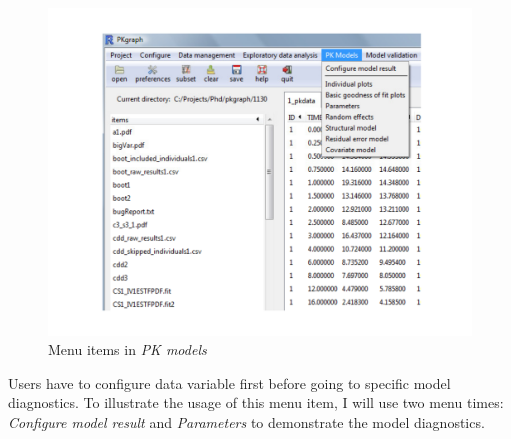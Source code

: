 \documentclass[a4paper]{article}
\begin{document}
\begin{figure}[h!tb] \centering
\includegraphics[scale=0.6]{pkmodel.pdf}
\caption{Menu items in \textit{PK models}}
\label{pkmodel}
\end{figure}
Users have to configure data variable first before going to specific model diagnostics. To illustrate the usage of this menu item, I will use two menu times: \textit{Configure model result} and \textit{Parameters} to demonstrate the model diagnostics.%
\end{document}
